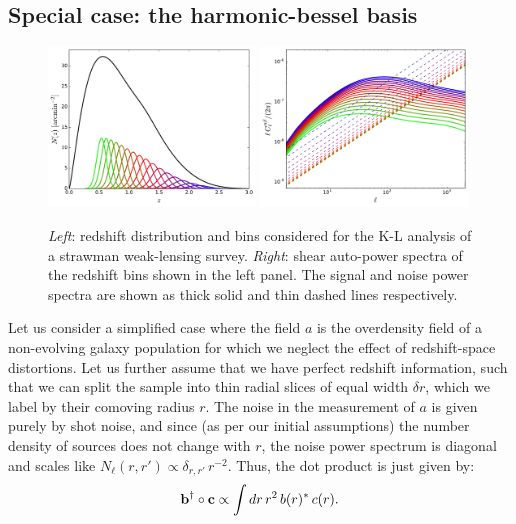 \documentclass[twocolumn,amsfont,amssymb,amsmath, showpacs,balancelastpage, nofootinbib]{revtex4-1}
\begin{document}
  \subsection{Special case: the harmonic-bessel basis}\label{ssec:results.bessel}
    \begin{figure}
      \centering
      \includegraphics[width=0.49\textwidth]{Figs/nz_lsst_wl}
      \includegraphics[width=0.49\textwidth]{Figs/c_ij_wl}
      \caption{{\sl Left}: redshift distribution and bins considered for the K-L analysis of a strawman weak-lensing survey. {\sl Right}: shear auto-power spectra of the redshift bins shown in the left panel. The signal and noise power spectra are shown as thick solid and thin dashed lines respectively.}\label{fig:nz_wl}
    \end{figure}
    Let us consider a simplified case where the field $a$ is the overdensity field of a non-evolving galaxy population for which we neglect the effect of redshift-space distortions. Let us further assume that we have perfect redshift information, such that we can split the sample into thin radial slices of equal width $\delta r$, which we label by their comoving radius $r$. The noise in the measurement of $a$ is given purely by shot noise, and since (as per our initial assumptions) the number density of sources does not change with $r$, the noise power spectrum is diagonal and scales like $N_\ell(r,r')\propto \delta_{r,r'}\,r^{-2}$. Thus, the dot product is just given by:
    \begin{equation}
      {\bf b}^\dag\circ{\bf c}\propto\int dr\,r^2\,b(r)^*\,c(r).
    \end{equation}
   
\end{document}
